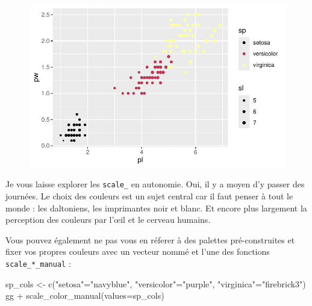 \documentclass[
  letterpaper,
  DIV=11,
  numbers=noendperiod]{scrreprt}
\newenvironment{Shaded}{\begin{snugshade}}{\end{snugshade}}
\newcommand{\AttributeTok}[1]{\textcolor[rgb]{0.40,0.45,0.13}{#1}}
\newcommand{\FunctionTok}[1]{\textcolor[rgb]{0.28,0.35,0.67}{#1}}
\newcommand{\NormalTok}[1]{\textcolor[rgb]{0.00,0.23,0.31}{#1}}
\newcommand{\OtherTok}[1]{\textcolor[rgb]{0.00,0.23,0.31}{#1}}
\newcommand{\SpecialCharTok}[1]{\textcolor[rgb]{0.37,0.37,0.37}{#1}}
\newcommand{\StringTok}[1]{\textcolor[rgb]{0.13,0.47,0.30}{#1}}
\begin{document}
\begin{figure}[H]

{\centering \includegraphics{ggplot2_files/figure-pdf/unnamed-chunk-29-1.pdf}

}

\end{figure}

Je vous laisse explorer les \texttt{scale\_} en autonomie. Oui, il y a
moyen d'y passer des journées. Le choix des couleurs est un sujet
central car il faut penser à tout le monde : les daltoniens, les
imprimantes noir et blanc. Et encore plus largement la perception des
couleurs par l'œil et le cerveau humains.

Vous pouvez également ne pas vous en réferer à des palettes
pré-construites et fixer vos propres couleurs avec un vecteur nommé et
l'une des fonctions \texttt{scale\_*\_manual} :

\begin{Shaded}
\begin{Highlighting}[]
\NormalTok{sp\_cols }\OtherTok{\textless{}{-}} \FunctionTok{c}\NormalTok{(}\StringTok{"setosa"}\OtherTok{=}\StringTok{"navyblue"}\NormalTok{, }\StringTok{"versicolor"}\OtherTok{=}\StringTok{"purple"}\NormalTok{, }\StringTok{"virginica"}\OtherTok{=}\StringTok{"firebrick3"}\NormalTok{)}
\NormalTok{gg }\SpecialCharTok{+} \FunctionTok{scale\_color\_manual}\NormalTok{(}\AttributeTok{values=}\NormalTok{sp\_cols)}
\end{Highlighting}
\end{Shaded}
\end{document}
